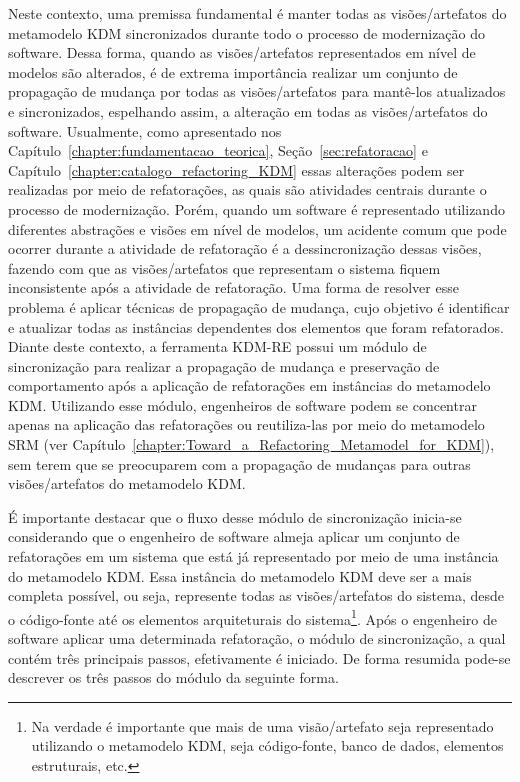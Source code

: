 Neste contexto, uma premissa fundamental é manter todas as visões/artefatos do metamodelo KDM sincronizados durante todo o processo de modernização do software. Dessa forma, quando as visões/artefatos representados em nível de modelos são alterados, é de extrema importância realizar um conjunto de propagação de mudança por todas as visões/artefatos para mantê-los atualizados e sincronizados, espelhando assim, a alteração em todas as visões/artefatos do software. Usualmente, como apresentado nos Capítulo~\ref{chapter:fundamentacao_teorica}, Seção~\ref{sec:refatoracao} e Capítulo~\ref{chapter:catalogo_refactoring_KDM} essas alterações podem ser realizadas por meio de refatorações, as quais são atividades centrais durante o processo de modernização. Porém, quando um software é representado utilizando diferentes abstrações e visões em nível de modelos, um acidente comum que pode ocorrer durante a atividade de refatoração é a dessincronização dessas visões, fazendo com que as visões/artefatos que representam o sistema fiquem inconsistente após a atividade de refatoração. Uma forma de resolver esse problema é aplicar técnicas de propagação de mudança, cujo objetivo é identificar e atualizar todas as instâncias dependentes dos elementos que foram refatorados. %
Diante deste contexto, a ferramenta KDM-RE possui um módulo de sincronização para realizar a propagação de mudança e preservação de comportamento após a aplicação de refatorações em instâncias do metamodelo KDM. Utilizando esse módulo, engenheiros de software podem se concentrar apenas na aplicação das refatorações ou reutiliza-las por meio do metamodelo SRM (ver Capítulo~\ref{chapter:Toward_a_Refactoring_Metamodel_for_KDM}), sem terem que se preocuparem com a propagação de mudanças para outras visões/artefatos do metamodelo KDM. 

É importante destacar que o fluxo desse módulo de sincronização inicia-se considerando que o engenheiro de software almeja aplicar um conjunto de refatorações em um sistema que está já representado por meio de uma instância do metamodelo KDM. Essa instância do metamodelo KDM deve ser a mais completa possível, ou seja, represente todas as visões/artefatos do sistema, desde o código-fonte até os elementos arquiteturais do sistema\footnote{Na verdade é importante que mais de uma visão/artefato seja representado utilizando o metamodelo KDM, seja código-fonte, banco de dados, elementos estruturais, etc.}. Após o engenheiro de software aplicar uma determinada refatoração, o módulo de sincronização, a qual contém três principais passos, efetivamente é iniciado. De forma resumida pode-se descrever os três passos do módulo da seguinte forma. 

